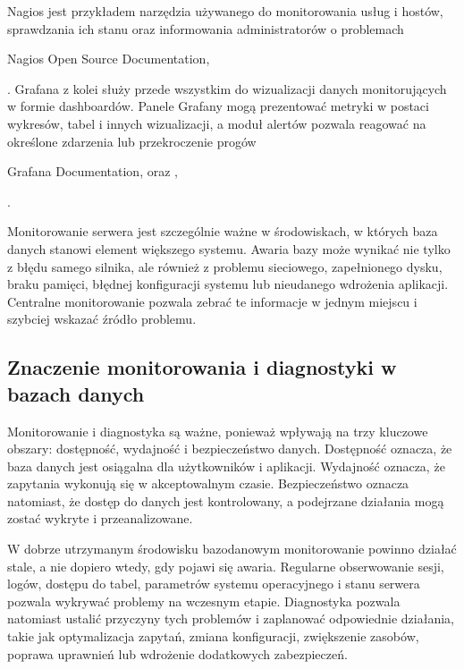 \documentclass[letterpaper,10pt,polish]{sphinxmanual}
\begin{document}
\sphinxAtStartPar
Nagios jest przykładem narzędzia używanego do monitorowania usług i hostów, sprawdzania ich stanu oraz informowania administratorów o problemach %
\begin{footnote}[6]\sphinxAtStartFootnote
Nagios Open Source Documentation, 
%
\end{footnote}. Grafana z kolei służy przede wszystkim do wizualizacji danych monitorujących w formie dashboardów. Panele Grafany mogą prezentować metryki w postaci wykresów, tabel i innych wizualizacji, a moduł alertów pozwala reagować na określone zdarzenia lub przekroczenie progów %
\begin{footnote}[7]\sphinxAtStartFootnote
Grafana Documentation,  oraz , 
%
\end{footnote}.

\sphinxAtStartPar
Monitorowanie serwera jest szczególnie ważne w środowiskach, w których baza danych stanowi element większego systemu. Awaria bazy może wynikać nie tylko z błędu samego silnika, ale również z problemu sieciowego, zapełnionego dysku, braku pamięci, błędnej konfiguracji systemu lub nieudanego wdrożenia aplikacji. Centralne monitorowanie pozwala zebrać te informacje w jednym miejscu i szybciej wskazać źródło problemu.


\subsection{Znaczenie monitorowania i diagnostyki w bazach danych}
\label{\detokenize{rozdzia_u0142_2/rozdzia_u0142_24/index:znaczenie-monitorowania-i-diagnostyki-w-bazach-danych}}
\sphinxAtStartPar
Monitorowanie i diagnostyka są ważne, ponieważ wpływają na trzy kluczowe obszary: dostępność, wydajność i bezpieczeństwo danych. Dostępność oznacza, że baza danych jest osiągalna dla użytkowników i aplikacji. Wydajność oznacza, że zapytania wykonują się w akceptowalnym czasie. Bezpieczeństwo oznacza natomiast, że dostęp do danych jest kontrolowany, a podejrzane działania mogą zostać wykryte i przeanalizowane.

\sphinxAtStartPar
W dobrze utrzymanym środowisku bazodanowym monitorowanie powinno działać stale, a nie dopiero wtedy, gdy pojawi się awaria. Regularne obserwowanie sesji, logów, dostępu do tabel, parametrów systemu operacyjnego i stanu serwera pozwala wykrywać problemy na wczesnym etapie. Diagnostyka pozwala natomiast ustalić przyczyny tych problemów i zaplanować odpowiednie działania, takie jak optymalizacja zapytań, zmiana konfiguracji, zwiększenie zasobów, poprawa uprawnień lub wdrożenie dodatkowych zabezpieczeń.
\end{document}
